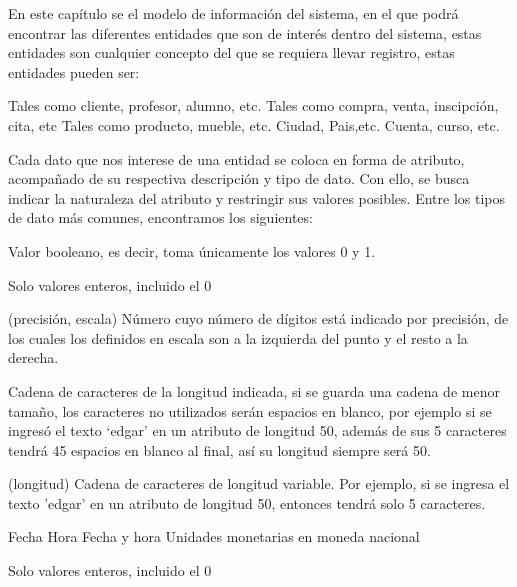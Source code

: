 En este capítulo se  el modelo de información del sistema, en el que podrá encontrar las diferentes entidades que son de interés dentro del sistema, estas entidades son cualquier concepto del que se requiera llevar registro, estas entidades pueden ser:

    \begin{bGlosario}
         Tales como cliente, profesor, alumno, etc.
           Tales como compra, venta, inscipción, cita, etc
           Tales como producto, mueble, etc.
               Ciudad, Pais,etc.
         Cuenta, curso, etc.
    \end{bGlosario}

Cada dato que nos interese de una entidad se coloca en forma de atributo, acompañado de su respectiva descripción y tipo de dato. Con ello, se busca indicar la naturaleza del atributo y restringir sus valores posibles. Entre los tipos de dato más comunes, encontramos los siguientes:

    \begin{bGlosario}

	    Valor booleano, es decir, toma únicamente los valores 0 y 1.

            Solo valores enteros, incluido el 0
            
         (precisión, escala)
            Número cuyo número de dígitos está indicado por precisión, de los cuales
            los definidos en escala son a la izquierda del punto y el resto a la derecha.
            
            Cadena de caracteres de la longitud indicada, si se guarda una cadena de menor
            tamaño, los caracteres no utilizados serán espacios en blanco, por ejemplo si
            se ingresó el texto ‘edgar’ en un atributo de longitud 50, además de sus 5 caracteres
            tendrá 45 espacios en blanco al final, así su longitud siempre será 50.
            
         (longitud)
            Cadena de caracteres de longitud variable. Por ejemplo, si se ingresa el texto 'edgar'
            en un atributo de longitud 50, entonces tendrá solo 5 caracteres.
            
         Fecha
         Hora
         Fecha y hora
         Unidades monetarias en moneda nacional
    
        Solo valores enteros, incluido el 0
    \end{bGlosario}

